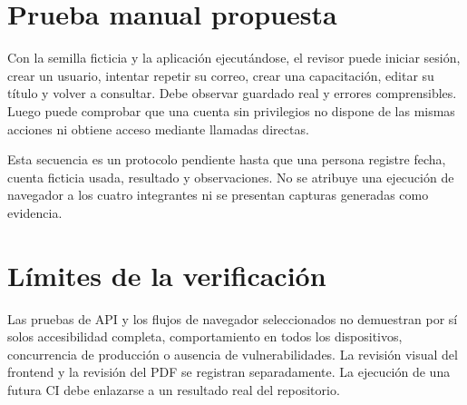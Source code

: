 \section{Prueba manual propuesta}
Con la semilla ficticia y la aplicación ejecutándose, el revisor puede iniciar sesión, crear un usuario, intentar repetir su correo, crear una capacitación, editar su título y volver a consultar. Debe observar guardado real y errores comprensibles. Luego puede comprobar que una cuenta sin privilegios no dispone de las mismas acciones ni obtiene acceso mediante llamadas directas.

Esta secuencia es un protocolo pendiente hasta que una persona registre fecha, cuenta ficticia usada, resultado y observaciones. No se atribuye una ejecución de navegador a los cuatro integrantes ni se presentan capturas generadas como evidencia.

\section{Límites de la verificación}
Las pruebas de API y los flujos de navegador seleccionados no demuestran por sí solos accesibilidad completa, comportamiento en todos los dispositivos, concurrencia de producción o ausencia de vulnerabilidades. La revisión visual del frontend y la revisión del PDF se registran separadamente. La ejecución de una futura CI debe enlazarse a un resultado real del repositorio.
